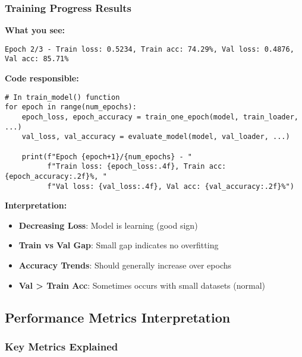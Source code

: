 \documentclass[12pt,a4paper]{article}
\begin{document}
\subsubsection{Training Progress Results}

\textbf{What you see:}
\begin{lstlisting}
Epoch 2/3 - Train loss: 0.5234, Train acc: 74.29%, Val loss: 0.4876, Val acc: 85.71%
\end{lstlisting}

\textbf{Code responsible:}
\begin{lstlisting}
# In train_model() function
for epoch in range(num_epochs):
    epoch_loss, epoch_accuracy = train_one_epoch(model, train_loader, ...)
    val_loss, val_accuracy = evaluate_model(model, val_loader, ...)

    print(f"Epoch {epoch+1}/{num_epochs} - "
          f"Train loss: {epoch_loss:.4f}, Train acc: {epoch_accuracy:.2f}%, "
          f"Val loss: {val_loss:.4f}, Val acc: {val_accuracy:.2f}%")
\end{lstlisting}

\textbf{Interpretation:}
\begin{itemize}
    \item \textbf{Decreasing Loss}: Model is learning (good sign)
    \item \textbf{Train vs Val Gap}: Small gap indicates no overfitting
    \item \textbf{Accuracy Trends}: Should generally increase over epochs
    \item \textbf{Val > Train Acc}: Sometimes occurs with small datasets (normal)
\end{itemize}

\subsection{Performance Metrics Interpretation}

\subsubsection{Key Metrics Explained}
\end{document}
